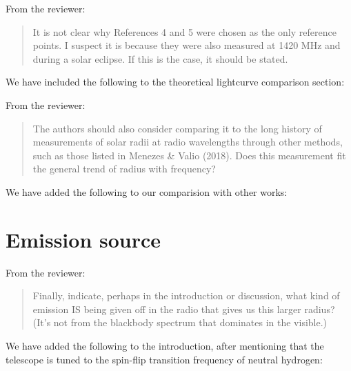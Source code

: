\documentclass{article}
\begin{document}
From the reviewer:

\begin{quote}
  It is not clear why References 4 and 5 were chosen as the only reference points.
  I suspect it is because they were also measured at 1420 MHz and during a solar eclipse. If this is the case, it should be stated.
\end{quote}

\noindent We have included the following to the theoretical lightcurve comparison section:

\begin{quote}
  
\end{quote}

\noindent From the reviewer:

\begin{quote}
  The authors should also consider comparing it to the long history of measurements of solar radii at radio wavelengths through other methods, such as those listed in Menezes \& Valio (2018).
  Does this measurement fit the general trend of radius with frequency?
\end{quote}

\noindent We have added the following to our comparision with other works:

\begin{quote}
  
\end{quote}

\section{Emission source}

\noindent From the reviewer:

\begin{quote}
  Finally, indicate, perhaps in the introduction or discussion, what kind of emission IS being given off in the radio that gives us this larger radius? (It’s not from the blackbody spectrum that dominates in the visible.)
\end{quote}

\noindent We have added the following to the introduction, after mentioning that the telescope is tuned to the spin-flip transition frequency of neutral hydrogen:

\begin{quote}
  
\end{quote}


\end{document}
